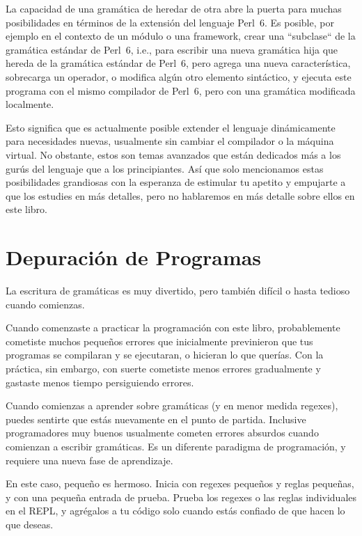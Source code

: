 La capacidad de una gramática de heredar de otra abre la
puerta para muchas posibilidades en términos de la extensión
del lenguaje Perl~6. Es posible, por ejemplo en el contexto de
un módulo o una framework, crear una ``subclase`` de la 
gramática estándar de Perl~6, i.e., para escribir una nueva
gramática hija que hereda de la gramática estándar de Perl~6, pero
agrega una nueva característica, sobrecarga un operador, o modifica
algún otro elemento sintáctico, y ejecuta este programa con el 
mismo compilador de Perl~6, pero con una gramática modificada
localmente.

Esto significa que es actualmente posible extender el lenguaje 
dinámicamente para necesidades nuevas, usualmente sin cambiar
el compilador o la máquina virtual. No obstante, estos son temas
avanzados que están dedicados más a los gurús del lenguaje 
que a los principiantes. Así que solo mencionamos estas posibilidades
grandiosas con la esperanza de estimular tu apetito y empujarte a
que los estudies en más detalles, pero no hablaremos en más detalle
sobre ellos en este libro.

\section{Depuración de Programas}

La escritura de gramáticas es muy divertido, pero también difícil
o hasta tedioso cuando comienzas.

Cuando comenzaste a practicar la programación con este libro,
probablemente cometiste muchos pequeños errores que inicialmente
previnieron que tus programas se compilaran y se ejecutaran, o
hicieran lo que querías. Con la práctica, sin embargo, con suerte
cometiste menos errores gradualmente y gastaste menos tiempo 
persiguiendo errores.


Cuando comienzas a aprender sobre gramáticas (y en menor medida regexes),
puedes sentirte que estás nuevamente en el punto de partida. Inclusive
programadores muy buenos usualmente cometen errores absurdos cuando
comienzan a escribir gramáticas. Es un diferente paradigma de programación,
y requiere una nueva fase de aprendizaje.

En este caso, pequeño es hermoso. Inicia con regexes pequeños y reglas pequeñas,
y con una pequeña entrada de prueba. Prueba los regexes o las reglas individuales
en el REPL, y agrégalos a tu código solo cuando estás confiado
de que hacen lo que deseas.

